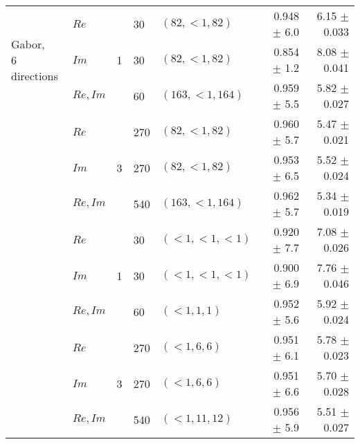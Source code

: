 \begin{tabularx}{\linewidth}{p{3cm} X X X X r r}
\midrule            
\multirow{3}{3cm}{Gabor, \newline 6 directions}
            & $Re$                  & \multirow{3}{1cm}{ 1 }
                                    &      30 &$(82, {<}1, 82)$   & 0.948 $\pm$ 6.0   & 6.15 $\pm$ 0.033 \\
            & $Im$                  &&     30 &$(82, {<}1, 82)$   & 0.854 $\pm$ 1.2   & 8.08 $\pm$ 0.041  \\
            & $Re,Im$               &&     60 &$(163, {<}1, 164)$ & 0.959 $\pm$ 5.5   & 5.82 $\pm$ 0.027 \\
            & $Re$                  & \multirow{3}{1cm}{ 3 }
                                    &     270 &$(82, {<}1, 82)$   & 0.960 $\pm$ 5.7   & 5.47 $\pm$ 0.021 \\
            & $Im$                  &&    270 &$(82, {<}1, 82)$   & 0.953 $\pm$ 6.5   & 5.52 $\pm$ 0.024 \\
            & $Re,Im$               &&    540 &$(163, {<}1, 164)$ & 0.962 $\pm$ 5.7   & 5.34 $\pm$ 0.019 \\

\midrule
\multirow{3}{3cm}{\dtcwt{}}
            & $Re$                  & \multirow{3}{1cm}{ 1 }
                                    &      30 & $({<}1, {<}1, {<}1)$  & 0.920 $\pm$ 7.7   &  7.08 $\pm$ 0.026  \\
            & $Im$                  &&     30 & $({<}1, {<}1, {<}1)$  & 0.900 $\pm$ 6.9   &  7.76 $\pm$ 0.046 \\
            & $Re,Im$               &&     60 & $({<}1, 1, 1)$    & 0.952 $\pm$ 5.6   &  5.92 $\pm$ 0.024 \\
            & $Re$                  & \multirow{3}{1cm}{ 3 }
                                    &     270 & $({<}1, 6, 6)$    & 0.951 $\pm$ 6.1   & 5.78 $\pm$ 0.023 \\
            & $Im$                  &&    270 & $({<}1, 6, 6)$    & 0.951 $\pm$ 6.6   & 5.70 $\pm$ 0.028 \\
            & $Re,Im$               &&    540 & $({<}1, 11, 12)$  & 0.956 $\pm$ 5.9   & 5.51 $\pm$ 0.027 \\
            

\end{tabularx}
